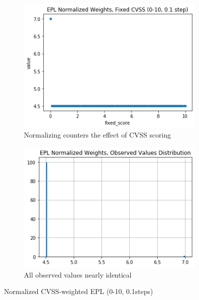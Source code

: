 \begin{figure}
    \centering
    \begin{subfigure}[t]{0.48\textwidth}
        \includegraphics[width=\linewidth]{output_31_1.png} 
        \caption{Normalizing counters the effect of CVSS scoring} 
        \label{fig:automation:results:epl_scores_norm}
    \end{subfigure}
     \begin{subfigure}[t]{0.48\textwidth}
        \centering
        \includegraphics[width=\linewidth]{output_31_3.png}
        \caption{All observed values nearly identical}
        \label{fig:automation:results:epl_dist_norm}
    \end{subfigure}
    \hfill
    \caption{Normalized CVSS-weighted EPL (0-10, 0.1steps) }
    \label{fig:automation:results:epl_norm}
\end{figure}

